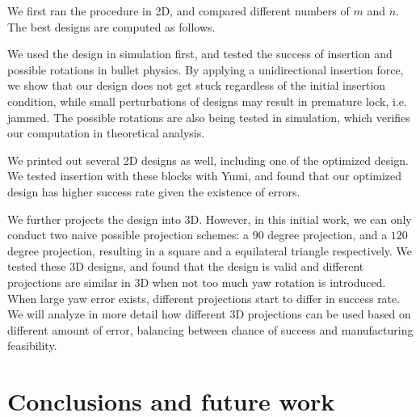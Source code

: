 \documentclass[letterpaper, 10 pt, conference]{ieeeconf}
\begin{document}
We first ran the procedure in 2D, and compared different numbers of $m$ and $n$. The best designs are computed as follows. 


We used the design in simulation first, and tested the success of insertion and possible rotations in bullet physics. By applying a unidirectional insertion force, we show that our design does not get stuck regardless of the initial insertion condition, while small perturbations of designs may result in premature lock, i.e. jammed. The possible rotations are also being tested in simulation, which verifies our computation in theoretical analysis. 


We printed out several 2D designs as well, including one of the optimized design. We tested insertion with these blocks with Yumi, and found that our optimized design has higher success rate given the existence of errors. 

We further projects the design into 3D. However, in this initial work, we can only conduct two naive possible projection schemes: a $90$ degree projection, and a $120$ degree projection, resulting in a square and a equilateral triangle respectively. We tested these 3D designs, and found that the design is valid and different projections are similar in 3D when not too much yaw rotation is introduced. When large yaw error exists, different projections start to differ in success rate. We will analyze in more detail how different 3D projections can be used based on different amount of error, balancing between chance of success and manufacturing feasibility. 





\section{Conclusions and future work}
\end{document}

